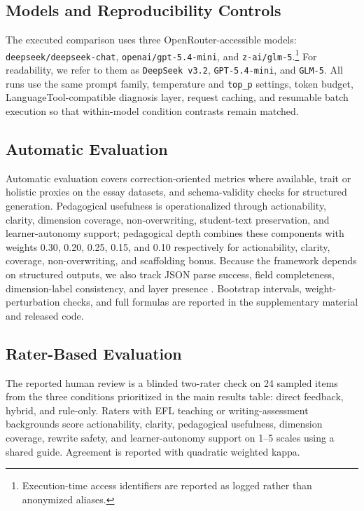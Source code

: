 \documentclass[preprint,12pt]{elsarticle}
\begin{document}
\subsection{Models and Reproducibility Controls}

The executed comparison uses three OpenRouter-accessible models: \texttt{deepseek/deepseek-chat}, \texttt{openai/gpt-5.4-mini}, and \texttt{z-ai/glm-5}.\footnote{Execution-time access identifiers are reported as logged rather than anonymized aliases.} For readability, we refer to them as \texttt{DeepSeek v3.2}, \texttt{GPT-5.4-mini}, and \texttt{GLM-5}. All runs use the same prompt family, temperature and \texttt{top\_p} settings, token budget, LanguageTool-compatible diagnosis layer, request caching, and resumable batch execution so that within-model condition contrasts remain matched.

\subsection{Automatic Evaluation}

Automatic evaluation covers correction-oriented metrics where available, trait or holistic proxies on the essay datasets, and schema-validity checks for structured generation. Pedagogical usefulness is operationalized through actionability, clarity, dimension coverage, non-overwriting, student-text preservation, and learner-autonomy support; pedagogical depth combines these components with weights 0.30, 0.20, 0.25, 0.15, and 0.10 respectively for actionability, clarity, coverage, non-overwriting, and scaffolding bonus. Because the framework depends on structured outputs, we also track JSON parse success, field completeness, dimension-label consistency, and layer presence \cite{geng2025jsonschemabench}. Bootstrap intervals, weight-perturbation checks, and full formulas are reported in the supplementary material and released code.

\subsection{Rater-Based Evaluation}

The reported human review is a blinded two-rater check on 24 sampled items from the three conditions prioritized in the main results table: direct feedback, hybrid, and rule-only. Raters with EFL teaching or writing-assessment backgrounds score actionability, clarity, pedagogical usefulness, dimension coverage, rewrite safety, and learner-autonomy support on 1--5 scales using a shared guide. Agreement is reported with quadratic weighted kappa.
\end{document}
